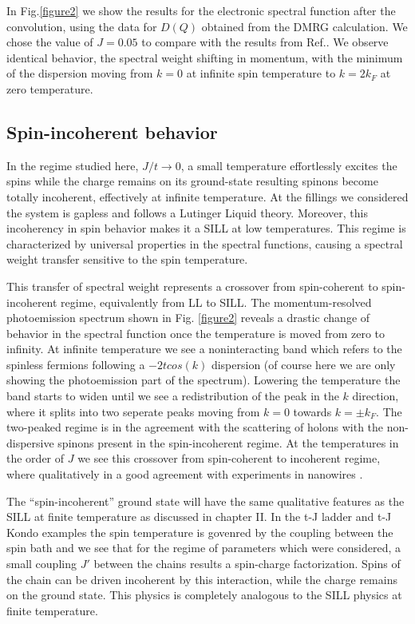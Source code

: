 \documentclass[article,11pt]{revtex4}
\begin{document}
In Fig.\ref{figure2} we show the results for the electronic spectral function after the convolution, using the data for $D(Q)$ obtained from the DMRG calculation. We chose the value of $J=0.05$ to compare with the results from Ref.\cite{Feiguin2009d}. We observe identical behavior, the spectral weight shifting in momentum, with the minimum of the dispersion moving from $k=0$ at infinite spin temperature to $k=2k_F$ at zero temperature. 

\subsection {Spin-incoherent behavior}

In the regime studied here, $J/t \rightarrow 0$, a small temperature effortlessly excites the spins while the charge remains on its ground-state resulting spinons become totally incoherent, effectively at infinite temperature. At the fillings we considered the system is gapless and follows a Lutinger Liquid theory. Moreover, this incoherency in spin behavior makes it a SILL at low temperatures. This regime is characterized by universal properties in the spectral functions, causing a spectral weight transfer sensitive to the spin temperature.

This transfer of spectral weight represents a crossover from spin-coherent to spin-incoherent regime, equivalently from LL to SILL. The momentum-resolved photoemission spectrum shown in Fig. \ref{figure2} reveals a drastic change of behavior in the spectral function once the temperature is moved from zero to infinity. At infinite temperature we see a noninteracting band which refers to the spinless fermions following a $-2 t cos(k)$ dispersion (of course here we are only showing the photoemission part of the spectrum). Lowering the temperature the band starts to widen until we see a redistribution of the peak in the $k$ direction, where it splits into two seperate peaks moving from $k=0$ towards $k= \pm k_F$. The two-peaked regime is in the agreement with the scattering of holons with the non-dispersive spinons present in the spin-incoherent regime. At the temperatures in the order of $J$ we see this crossover from spin-coherent to incoherent regime, where qualitatively in a good agreement with experiments in nanowires \cite{Steinberg2006}. 

The ``spin-incoherent'' ground state will have the same qualitative features as the SILL at finite temperature as discussed in chapter II. In the t-J ladder and t-J Kondo examples the spin temperature is govenred by the coupling between the spin bath and we see that for the regime of parameters which were considered, a small coupling $J'$ between the chains results a spin-charge factorization. Spins of the chain can be driven incoherent by this interaction, while the charge remains on the ground state. This physics is completely analogous to the SILL physics at finite temperature. 
\end{document}
